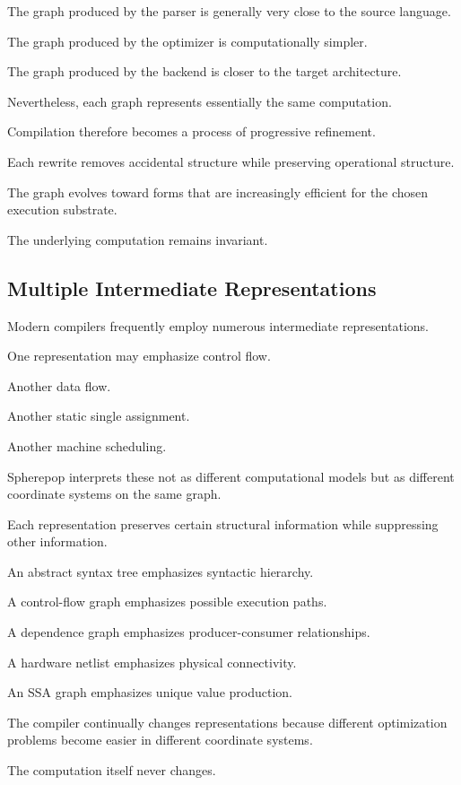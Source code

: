 \documentclass[12pt,oneside]{article}
\begin{document}
The graph produced by the parser is generally very close to the source language.

The graph produced by the optimizer is computationally simpler.

The graph produced by the backend is closer to the target architecture.

Nevertheless, each graph represents essentially the same computation.

Compilation therefore becomes a process of progressive refinement.

Each rewrite removes accidental structure while preserving operational structure.

The graph evolves toward forms that are increasingly efficient for the chosen execution substrate.

The underlying computation remains invariant.

\subsection{Multiple Intermediate Representations}

Modern compilers frequently employ numerous intermediate representations.

One representation may emphasize control flow.

Another data flow.

Another static single assignment.

Another machine scheduling.

Spherepop interprets these not as different computational models but as different coordinate systems on the same graph.

Each representation preserves certain structural information while suppressing other information.

An abstract syntax tree emphasizes syntactic hierarchy.

A control-flow graph emphasizes possible execution paths.

A dependence graph emphasizes producer-consumer relationships.

A hardware netlist emphasizes physical connectivity.

An SSA graph emphasizes unique value production.

The compiler continually changes representations because different optimization problems become easier in different coordinate systems.

The computation itself never changes.
\end{document}
